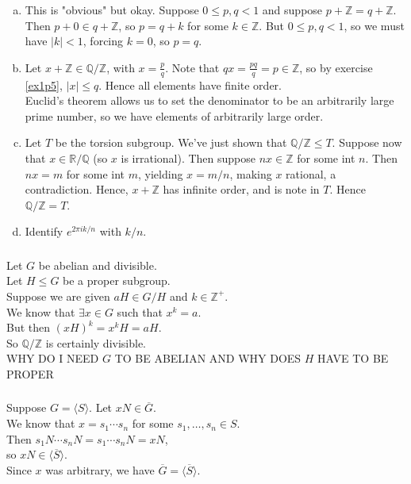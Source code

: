 \documentclass{article}
\newcommand{\ints}{\mathbb{Z}}
\newcommand{\reals}{\mathbb{R}}
\newcommand{\rats}{\mathbb{Q}}
\newcommand{\abs}[1]{| #1 |}
\renewcommand{\bar}{\overline}
\newcommand{\cyclic}[1]{\langle#1\rangle}
\begin{document}
\subsubsection{}\label{ex1p14}
\begin{enumerate}[(a)]
\item This is "obvious" but okay. Suppose $0\leq p,q < 1$ and suppose $p+\ints = q+\ints$. Then $p+0 \in q+\ints$, so $p=q+k$ for some $k\in\ints$. But $0\leq p,q < 1$, so we must have $\abs{k} < 1$, forcing $k=0$, so $p=q$.
\item Let $x+\ints \in \rats/\ints$, with $x = \frac{p}{q}$. Note that $qx=\frac{pq}{q} = p \in \ints$, so by exercise \ref{ex1p5}, $\abs{x} \leq q$. Hence all elements have finite order.\\
Euclid's theorem allows us to set the denominator to be an arbitrarily large prime number, so we have elements of arbitrarily large order.\\
\item Let $T$ be the torsion subgroup. We've just shown that $\rats/\ints \leq T$.  Suppose now that $x\in\reals/\rats$ (so $x$ is irrational). Then suppose $nx \in \ints$ for some int $n$. Then $nx = m$ for some int $m$, yielding $x=m/n$, making $x$ rational, a contradiction. Hence, $x+\ints$ has infinite order, and is note in $T$. Hence $\rats/\ints = T$.
\item Identify $e^{2\pi ik/n}$ with $k/n$. 
\end{enumerate}
\subsubsection{}\label{ex1p15}
Let $G$ be abelian and divisible.\\
Let $H \leq G$ be a proper subgroup.\\
Suppose we are given $aH \in G/H$ and $k \in \ints^{+}$.\\
We know that $\exists x \in G$ such that $x^k = a$.\\
But then $(xH)^k = x^kH = aH$.\\
So $\rats/\ints$ is certainly divisible.\\
{\large WHY DO I NEED $G$ TO BE ABELIAN AND WHY DOES $H$ HAVE TO BE PROPER}
\subsubsection{}\label{ex1p16}
Suppose $G=\cyclic{S}$. Let $xN\in\bar{G}$.\\
We know that $x=s_1\cdots s_n$ for some $s_1,\ldots,s_n\in S$.\\
Then $s_1N\cdots s_nN = s_1\cdots s_n N = xN$,\\
so $xN \in \cyclic{\bar{S}}$.\\
Since $x$ was arbitrary, we have $\bar{G}=\cyclic{\bar{S}}$.
\end{document}
